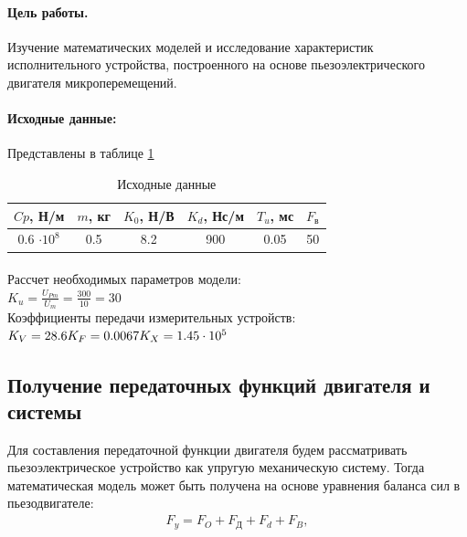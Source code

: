 \documentclass[a4paper,12pt]{article}
\renewcommand{\arraystretch}{1.5}
\begin{document}
	
	\paragraph{Цель работы.}  Изучение математических моделей и исследование характеристик исполнительного устройства, построенного на основе пьезоэлектрического двигателя микроперемещений. 
	\paragraph {Исходные данные:} Представлены в таблице \ref{t_1}
	\begin{table}[h]
		\centering
		\caption{Исходные данные}
		\renewcommand{\arraystretch}{2} 
		\renewcommand{\tabcolsep}{0.85cm}
		\begin{center}
			\begin{tabular}{|c|c|c|c|c|c|}
				\hline
				$Cp$, Н/м & $m$, кг & $K_0$, Н/В & $K_d$, Нс/м & $T_u$, мс & $F_{\text{в}}$ \\ \hline
				0.6 $\cdot 10^8$ & 0.5 & 8.2 & 900 & 0.05 & 50  \\ \hline
			\end{tabular}
		\end{center}
		\label{t_1}
	\end{table}
	
	\paragraph {} Рассчет необходимых параметров модели:\\
	
	\noindent
	$K_u=\displaystyle\frac{U_{Pm}}{U_m}=\frac{300}{10}=30$\\
	
	Коэффициенты передачи измерительных устройств:\\
	
	\noindent
	$
	K_V=28.6\\
	K_F=0.0067\\
	K_X=1.45\cdot 10^5\\	
	$
	\newpage
	\begin{center}
		\section{Получение передаточных функций двигателя и системы}
	\end{center}
\par
		Для составления передаточной функции двигателя будем рассматривать пьезоэлектрическое устройство как упругую механическую систему. Тогда математическая модель может быть получена на основе уравнения баланса сил в пьезодвигателе:
		\begin{gather}
		F_y = F_O + F_\text{Д} + F_d + F_B,
		\label{v_1}
		\end{gather}\\
		
\end{document}
